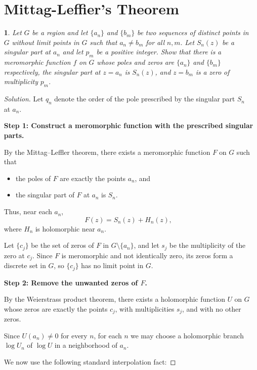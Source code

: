 \documentclass[12pt, a4paper]{report}
\theoremstyle{spaced}
\newtheorem{exercise}{}
\begin{document}
\section{Mittag-Leffier's Theorem}
\begin{exercise}
	Let $G$ be a region and let $\{a_n\}$ and $\{b_m\}$ be two sequences of distinct points in $G$ without limit points in $G$ such that $a_n \neq b_m$ for all $n,m$. Let $S_n(z)$ be a singular part at $a_n$ and let $p_m$ be a positive integer. Show that there is a meromorphic function $f$ on $G$ whose poles and zeros are $\{a_n\}$ and $\{b_m\}$ respectively, the singular part at $z = a_n$ is $S_n(z)$, and $z = b_m$ is a zero of multiplicity $p_m$.
\end{exercise}


\begin{proof}[Solution]
	Let $q_n$ denote the order of the pole prescribed by the singular part $S_n$ at $a_n$.

	\medskip
	\noindent \textbf{Step 1: Construct a meromorphic function with the prescribed singular parts.}

	By the Mittag--Leffler theorem, there exists a meromorphic function $F$ on $G$ such that

	\begin{itemize}
		\item the poles of $F$ are exactly the points $a_n$, and
		\item the singular part of $F$ at $a_n$ is $S_n$.
	\end{itemize}

	Thus, near each $a_n$,
	\[
		F(z)=S_n(z)+H_n(z),
	\]
	where $H_n$ is holomorphic near $a_n$.

	Let $\{c_j\}$ be the set of zeros of $F$ in $G\setminus\{a_n\}$, and let $s_j$ be the multiplicity of the zero at $c_j$. Since $F$ is meromorphic and not identically zero, its zeros form a discrete set in $G$, so $\{c_j\}$ has no limit point in $G$.

	\medskip
	\noindent \textbf{Step 2: Remove the unwanted zeros of $F$.}

	By the Weierstrass product theorem, there exists a holomorphic function $U$ on $G$ whose zeros are exactly the points $c_j$, with multiplicities $s_j$, and with no other zeros.

	Since $U(a_n)\neq 0$ for every $n$, for each $n$ we may choose a holomorphic branch $\log U_n$ of $\log U$ in a neighborhood of $a_n$.

	We now use the following standard interpolation fact:


\end{proof}
\end{document}
